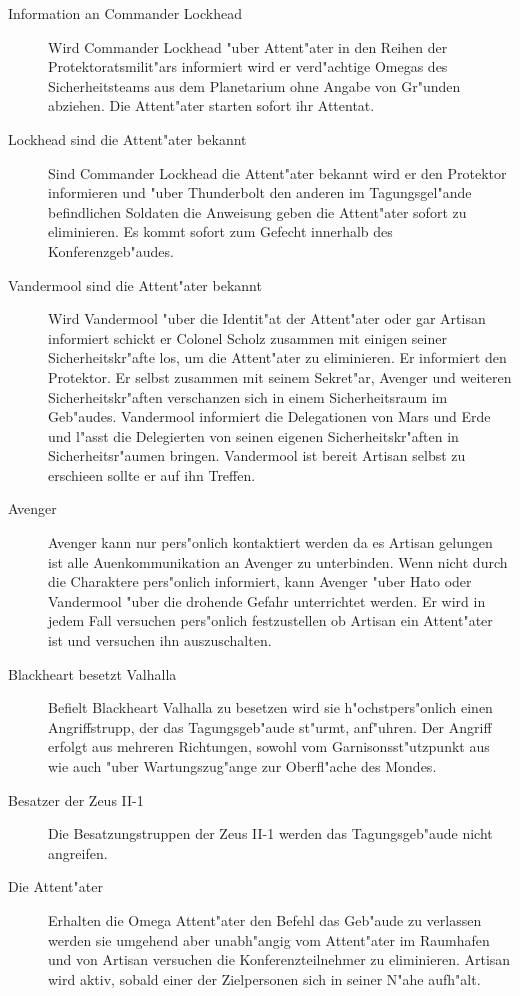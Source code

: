 \begin{description}
	\item[Information an Commander Lockhead] Wird Commander Lockhead "uber Attent"ater in den Reihen der Protektoratsmilit"ars informiert 
		wird er verd"achtige Omegas des Sicherheitsteams aus dem Planetarium ohne Angabe von Gr"unden abziehen. Die Attent"ater starten sofort ihr Attentat.
	\item[Lockhead sind die Attent"ater bekannt] Sind Commander Lockhead die Attent"ater bekannt wird er den Protektor informieren und 
		"uber Thunderbolt den anderen im Tagungsgel"ande befindlichen Soldaten die Anweisung geben die Attent"ater sofort zu eliminieren. Es kommt sofort zum Gefecht innerhalb des Konferenzgeb"audes.
	\item[Vandermool sind die Attent"ater bekannt] Wird Vandermool "uber die Identit"at der Attent"ater oder gar Artisan informiert schickt 	    er Colonel Scholz zusammen mit einigen seiner Sicherheitskr"afte los, um die Attent"ater zu eliminieren. Er informiert den 
		Protektor. Er selbst zusammen mit seinem Sekret"ar, Avenger und weiteren Sicherheitskr"aften verschanzen sich in einem Sicherheitsraum im Geb"audes. Vandermool informiert die Delegationen von Mars und Erde und l"asst die Delegierten von seinen eigenen Sicherheitskr"aften in Sicherheitsr"aumen bringen. Vandermool ist bereit Artisan selbst zu erschie\3en sollte er auf ihn Treffen.
	\item[Avenger] Avenger kann nur pers"onlich kontaktiert werden da es Artisan gelungen ist alle Au\3enkommunikation an Avenger 	
		zu unterbinden. Wenn nicht durch die Charaktere pers"onlich informiert, kann Avenger "uber Hato oder Vandermool "uber die drohende Gefahr unterrichtet werden. Er wird in jedem Fall versuchen pers"onlich festzustellen ob Artisan ein Attent"ater ist und versuchen ihn auszuschalten.
	\item[Blackheart besetzt Valhalla] Befielt Blackheart Valhalla zu besetzen wird sie h"ochstpers"onlich einen Angriffstrupp, der das 
		Tagungsgeb"aude st"urmt, anf"uhren. Der Angriff erfolgt aus mehreren Richtungen, sowohl vom Garnisonsst"utzpunkt aus wie auch "uber Wartungszug"ange zur Oberfl"ache des Mondes.
	\item[Besatzer der Zeus II-1] Die Besatzungstruppen der Zeus II-1 werden das Tagungsgeb"aude nicht angreifen.
	\item[Die Attent"ater] Erhalten die Omega Attent"ater den Befehl das Geb"aude zu verlassen werden sie umgehend aber unabh"angig vom 
		Attent"ater im Raumhafen und von Artisan versuchen die Konferenzteilnehmer zu eliminieren. Artisan wird aktiv, sobald einer der Zielpersonen sich in seiner N"ahe aufh"alt.
\end{description}


